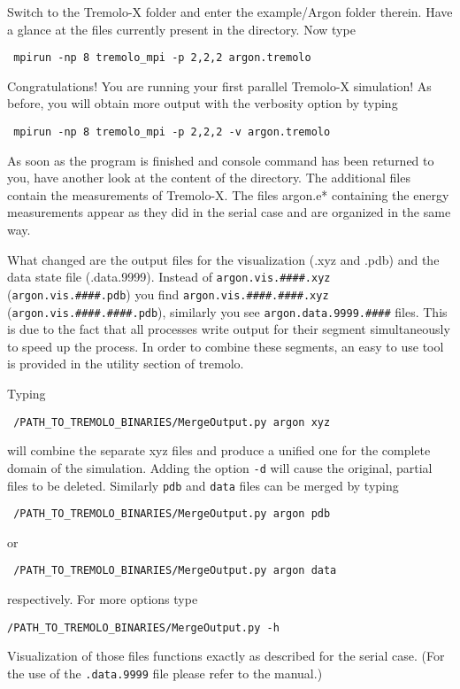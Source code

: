 
Switch to the Tremolo-X folder and enter the example/Argon folder therein.
Have a glance at the files currently present in the directory.
Now type
\begin{lstlisting}
 mpirun -np 8 tremolo_mpi -p 2,2,2 argon.tremolo
\end{lstlisting}
Congratulations! You are running your first parallel Tremolo-X simulation!
\bigbreak
As before, you will obtain more output with the verbosity option by typing
\begin{lstlisting}
 mpirun -np 8 tremolo_mpi -p 2,2,2 -v argon.tremolo
\end{lstlisting}

As soon as the program is finished and console command has been returned to you, have another look at the content of the directory. The additional files contain the measurements of Tremolo-X.
The files argon.e* containing the energy measurements appear as they did in the serial case and are organized in the same way.

\bigbreak
What changed are the output files for the visualization (.xyz and .pdb) and the data state file (.data.9999).
Instead of {\tt argon.vis.\#\#\#\#.xyz} ({\tt argon.vis.\#\#\#\#.pdb}) you find {\tt argon.vis.\#\#\#\#.\#\#\#\#.xyz} ({\tt argon.vis.\#\#\#\#.\#\#\#\#.pdb}), similarly you see {\tt argon.data.9999.\#\#\#\#} files.
This is due to the fact that all processes write output for their segment simultaneously to speed up the process.
In order to combine these segments, an easy to use tool is provided in the utility section of tremolo.

Typing
\begin{lstlisting}
 /PATH_TO_TREMOLO_BINARIES/MergeOutput.py argon xyz
\end{lstlisting}
will combine the separate xyz files and produce a unified one for the complete domain of the simulation. Adding the option {\tt -d} will cause the original, partial files to be deleted. Similarly
{\tt pdb} and {\tt data} files can be merged by typing 
\begin{lstlisting}
 /PATH_TO_TREMOLO_BINARIES/MergeOutput.py argon pdb
\end{lstlisting}
or 
\begin{lstlisting}
 /PATH_TO_TREMOLO_BINARIES/MergeOutput.py argon data
\end{lstlisting}
respectively. For more options type 
\begin{lstlisting}
/PATH_TO_TREMOLO_BINARIES/MergeOutput.py -h
\end{lstlisting}

Visualization of those files functions exactly as described for the serial case. (For the use of the {\tt .data.9999} file please refer to the manual.)
